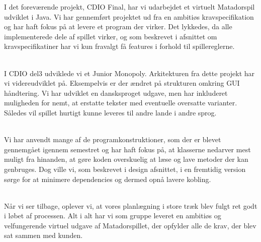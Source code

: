 \begin{flushleft}
\doublespacing

I det foreværende projekt, CDIO Final, har vi udarbejdet et virtuelt Matadorspil udviklet i Java. Vi har gennemført projektet ud fra en ambitiøs kravspecifikation og har haft fokus på at levere et program der virker. Det lykkedes, da alle implementerede dele af spillet virker, og som beskrevet i afsnittet om kravspecifikatiner har vi kun fravalgt få features i forhold til spillereglerne. \\\

I CDIO del3 udviklede vi et Junior Monopoly. Arkitekturen fra dette projekt har vi videreudviklet på. Eksempelvis er der ændret på strukturen omkring GUI håndtering. Vi har udviklet en dansksproget udgave, men har inkluderet muligheden for nemt, at erstatte tekster med eventuelle oversatte varianter. Således vil spillet hurtigt kunne leveres til andre lande i andre sprog.\\\

Vi har anvendt mange af de programkonstruktioner, som der er blevet gennemgået igennem semestret og har haft fokus på, at klasserne nedarver mest muligt fra hinanden, at gøre koden overskuelig at læse og lave metoder der kan genbruges. Dog ville vi, som beskrevet i design afsnittet, i en fremtidig version sørge for at minimere dependencies og dermed opnå lavere kobling.\\\

Når vi ser tilbage, oplever vi, at vores planlægning i store træk blev fulgt ret godt i løbet af processen.
Alt i alt har vi som gruppe leveret en ambitiøs og velfungerende virtuel udgave af Matadorspillet, der opfylder alle de krav, der blev sat sammen med kunden.




\end{flushleft}